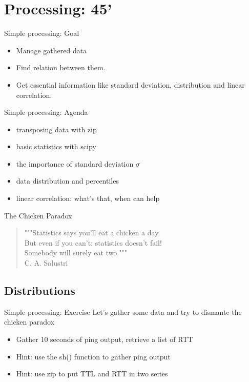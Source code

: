 \section{Processing: 45'}

\begin{frame}[fragile]{Simple processing: Goal}
\begin{itemize}
\item Manage gathered data
\item Find relation between them. 
\item Get essential information like standard deviation, 
distribution and linear correlation.
\end{itemize}
\end{frame}

\begin{frame}[fragile]{Simple processing: Agenda}
\begin{itemize}
\item transposing data with zip
\item basic statistics with scipy
\item the importance of standard deviation $\sigma$
\item data distribution and percentiles
\item linear correlation: what's that, when can help
\end{itemize}
\end{frame}

\begin{frame}[fragile]{The Chicken Paradox}
\begin{verse}
"""Statistics says you'll eat a chicken a day. \\
But even if you can't: statistics doesn't fail! \\
Somebody will surely eat two.""" \\
\hfill C. A. Salustri
\end{verse}
\end{frame}

\subsection{Distributions}
\begin{frame}[fragile]{Simple processing: Exercise}
Let's gather some data and try to dismante the chicken paradox
\begin{itemize}
\item Gather 10 seconds of ping output, retrieve a list of RTT
\item Hint: use the sh() function to gather ping output
\item Hint: use zip to put TTL and RTT in two series
\end{itemize}
\end{frame}

